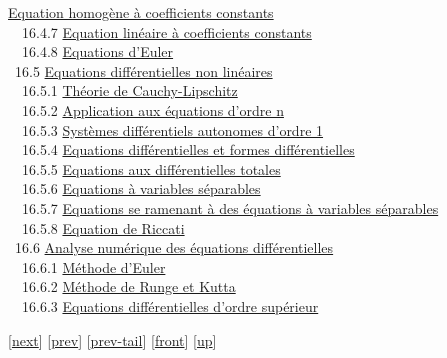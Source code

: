 \documentclass[]{article}
\begin{document}
\href{coursse89.html\#x108-49200016.4.6}{Equation homogène à
coefficients constants} \\ ~~16.4.7
\href{coursse89.html\#x108-49300016.4.7}{Equation linéaire à
coefficients constants} \\ ~~16.4.8
\href{coursse89.html\#x108-49400016.4.8}{Equations d'Euler} \\ ~16.5
\href{coursse90.html\#x109-49500016.5}{Equations différentielles non
linéaires} \\ ~~16.5.1 \href{coursse90.html\#x109-49600016.5.1}{Théorie
de Cauchy-Lipschitz} \\ ~~16.5.2
\href{coursse90.html\#x109-49700016.5.2}{Application aux équations
d'ordre n} \\ ~~16.5.3 \href{coursse90.html\#x109-49800016.5.3}{Systèmes
différentiels autonomes d'ordre 1} \\ ~~16.5.4
\href{coursse90.html\#x109-49900016.5.4}{Equations différentielles et
formes différentielles} \\ ~~16.5.5
\href{coursse90.html\#x109-50000016.5.5}{Equations aux différentielles
totales} \\ ~~16.5.6 \href{coursse90.html\#x109-50100016.5.6}{Equations
à variables séparables} \\ ~~16.5.7
\href{coursse90.html\#x109-50200016.5.7}{Equations se ramenant à des
équations à variables séparables} \\ ~~16.5.8
\href{coursse90.html\#x109-50300016.5.8}{Equation de Riccati} \\ ~16.6
\href{coursse91.html\#x110-50400016.6}{Analyse numérique des équations
différentielles} \\ ~~16.6.1
\href{coursse91.html\#x110-50500016.6.1}{Méthode d'Euler} \\ ~~16.6.2
\href{coursse91.html\#x110-50600016.6.2}{Méthode de Runge et Kutta} \\
~~16.6.3 \href{coursse91.html\#x110-50700016.6.3}{Equations
différentielles d'ordre supérieur}

{[}\href{coursch18.html}{next}{]} {[}\href{coursch16.html}{prev}{]}
{[}\href{coursch16.html\#tailcoursch16.html}{prev-tail}{]}
{[}\href{coursch17.html}{front}{]}
{[}\href{cours.html\#coursch17.html}{up}{]}
\end{document}

